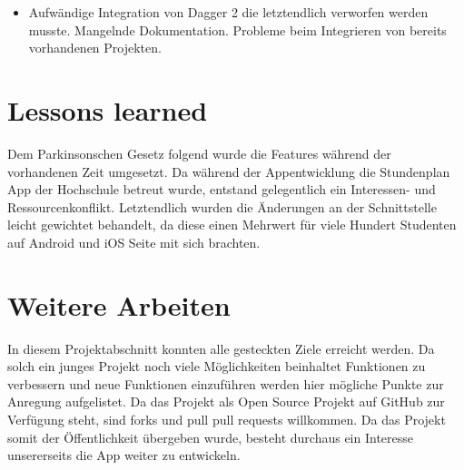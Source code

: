 \documentclass[
    DIV12,
    cleardouble=plain,
    headings=normal,
    pdftex,
    headexclude,footexclude,
    final
]{scrreprt}
\begin{document}
\begin{itemize}
\item Aufwändige Integration von Dagger 2 die letztendlich verworfen werden musste. Mangelnde Dokumentation. Probleme beim Integrieren von bereits vorhandenen Projekten.
\end{itemize}

\newpage

\chapter{Lessons learned}
Dem Parkinsonschen Gesetz folgend wurde die Features während der vorhandenen Zeit umgesetzt. Da während der Appentwicklung die Stundenplan App der Hochschule betreut wurde, entstand gelegentlich ein Interessen- und Ressourcenkonflikt. Letztendlich wurden die Änderungen an der Schnittstelle leicht gewichtet behandelt, da diese einen Mehrwert für viele Hundert Studenten auf Android und iOS Seite mit sich brachten.


\newpage

\chapter{Weitere Arbeiten}
In diesem Projektabschnitt konnten alle gesteckten Ziele erreicht werden. Da solch ein junges Projekt noch viele Möglichkeiten beinhaltet Funktionen zu verbessern und neue Funktionen einzuführen werden hier mögliche Punkte zur Anregung aufgelistet. Da das Projekt als Open Source Projekt auf GitHub zur Verfügung steht, sind forks und pull pull requests willkommen. Da das Projekt somit der Öffentlichkeit übergeben wurde, besteht durchaus ein Interesse unsererseits die App weiter zu entwickeln.





\newpage


\listoffigures
\end{document}
